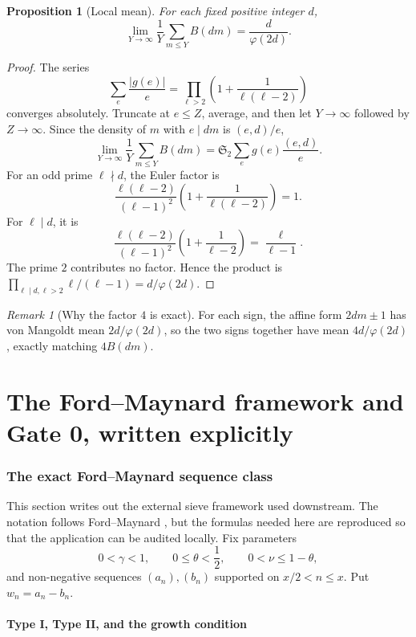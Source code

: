 \documentclass[11pt]{article}
\newtheorem{proposition}[theorem]{Proposition}
\theoremstyle{definition}
\theoremstyle{remark}
\newtheorem{remark}[theorem]{Remark}
\newcommand{\1}{\mathbf 1}
\begin{document}
\begin{proposition}[Local mean]\label{prop:Bmean}
For each fixed positive integer $d$,
\[
 \lim_{Y\to\infty}\frac1Y\sum_{m\le Y}B(dm)=\frac d{\varphi(2d)}.
\]
\end{proposition}
\begin{proof}
The series
\[
 \sum_e\frac{|g(e)|}{e}=\prod_{\ell>2}\left(1+\frac1{\ell(\ell-2)}\right)
\]
converges absolutely.  Truncate at $e\le Z$, average, and then let $Y\to\infty$ followed by $Z\to\infty$.
Since the density of $m$ with $e\mid dm$ is $(e,d)/e$,
\[
 \lim_{Y\to\infty}\frac1Y\sum_{m\le Y}B(dm)
 =\mathfrak S_2\sum_e g(e)\frac{(e,d)}e.
\]
For an odd prime $\ell\nmid d$, the Euler factor is
\[
 \frac{\ell(\ell-2)}{(\ell-1)^2}\left(1+\frac1{\ell(\ell-2)}\right)=1.
\]
For $\ell\mid d$, it is
\[
 \frac{\ell(\ell-2)}{(\ell-1)^2}\left(1+\frac1{\ell-2}\right)=\frac\ell{\ell-1}.
\]
The prime $2$ contributes no factor.  Hence the product is
$\prod_{\ell\mid d,\ell>2}\ell/(\ell-1)=d/\varphi(2d)$.
\end{proof}

\begin{remark}[Why the factor $4$ is exact]
For each sign, the affine form $2dm\pm1$ has von Mangoldt mean $2d/\varphi(2d)$, so the two signs together
have mean $4d/\varphi(2d)$, exactly matching $4B(dm)$.
\end{remark}

\part{The Ford--Maynard framework and Gate 0, written explicitly}

\section{The exact Ford--Maynard sequence class}

This section writes out the external sieve framework used downstream.  The notation follows Ford--Maynard
\cite{FM24}, but the formulas needed here are reproduced so that the application can be audited locally.
Fix parameters
\[
 0<\gamma<1,\qquad0\le\theta<\frac12,\qquad0<\nu\le1-\theta,
\]
and non-negative sequences $(a_n),(b_n)$ supported on $x/2<n\le x$.  Put $w_n=a_n-b_n$.

\subsection{Type I, Type II, and the growth condition}
\end{document}
